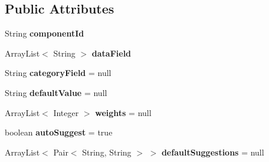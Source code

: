 \subsection*{Public Attributes}
\begin{DoxyCompactItemize}
\item 
\mbox{\label{classcom_1_1example_1_1searchwidget_1_1_builder_1_1_search_prop_a2c3e3f6cb8949aceb106b2c226a8c5f4}} 
String {\bfseries component\+Id}
\item 
\mbox{\label{classcom_1_1example_1_1searchwidget_1_1_builder_1_1_search_prop_abc47aa7fa421e9ed2392cb4f93552e50}} 
Array\+List$<$ String $>$ {\bfseries data\+Field}
\item 
\mbox{\label{classcom_1_1example_1_1searchwidget_1_1_builder_1_1_search_prop_a3f2dea58ce8707697f08041b45228689}} 
String {\bfseries category\+Field} = null
\item 
\mbox{\label{classcom_1_1example_1_1searchwidget_1_1_builder_1_1_search_prop_a29c0eb3f8374a28e2161d37b42e2dafe}} 
String {\bfseries default\+Value} = null
\item 
\mbox{\label{classcom_1_1example_1_1searchwidget_1_1_builder_1_1_search_prop_a4dac5c2d38ff1192e2e7710dbda46b63}} 
Array\+List$<$ Integer $>$ {\bfseries weights} = null
\item 
\mbox{\label{classcom_1_1example_1_1searchwidget_1_1_builder_1_1_search_prop_a3a9e8d9bb444f5294a6dacf5470db1fa}} 
boolean {\bfseries auto\+Suggest} = true
\item 
\mbox{\label{classcom_1_1example_1_1searchwidget_1_1_builder_1_1_search_prop_a9df0f3068bed542b1e79cf49b7d6237b}} 
Array\+List$<$ Pair$<$ String, String $>$ $>$ {\bfseries default\+Suggestions} = null
\item 
\mbox{\label{classcom_1_1example_1_1searchwidget_1_1_builder_1_1_search_prop_a41c9db4f0cf3c1cb7f2a2beb228cd33e}} 

\end{DoxyCompactItemize}
